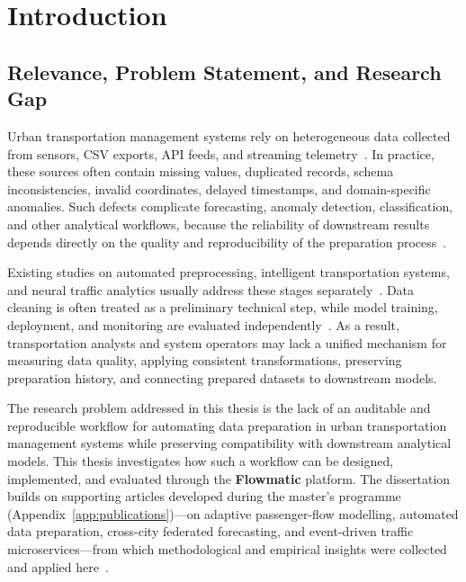 %
%
\chapter{Introduction}
\label{chap:intro}
\setlength{\parskip}{1em}

\section{Relevance, Problem Statement, and Research Gap}

Urban transportation management systems rely on heterogeneous data collected from sensors, CSV exports, API feeds, and streaming telemetry~\cite{wang1996beyond,pipino2002data,zanella2014iot}. In practice, these sources often contain missing values, duplicated records, schema inconsistencies, invalid coordinates, delayed timestamps, and domain-specific anomalies. Such defects complicate forecasting, anomaly detection, classification, and other analytical workflows, because the reliability of downstream results depends directly on the quality and reproducibility of the preparation process~\cite{sculley2015hidden}.

Existing studies on automated preprocessing, intelligent transportation systems, and neural traffic analytics usually address these stages separately~\cite{liu2022automated,feurer2019auto,feurer2015autosklearn,its_bigdata2018,nie2023patchtst,yu2018stgcn,zeng2023transformers}. Data cleaning is often treated as a preliminary technical step, while model training, deployment, and monitoring are evaluated independently~\cite{zaharia2018accelerating,kreutzberger2022mlops}. As a result, transportation analysts and system operators may lack a unified mechanism for measuring data quality, applying consistent transformations, preserving preparation history, and connecting prepared datasets to downstream models.

The research problem addressed in this thesis is the lack of an auditable and reproducible workflow for automating data preparation in urban transportation management systems while preserving compatibility with downstream analytical models. This thesis investigates how such a workflow can be designed, implemented, and evaluated through the \textbf{Flowmatic} platform. The dissertation builds on supporting articles developed during the master's programme (Appendix~\ref{app:publications})---on adaptive passenger-flow modelling, automated data preparation, cross-city federated forecasting, and event-driven traffic microservices---from which methodological and empirical insights were collected and applied here~\cite{bakytuly2024hybrid,yedilkhan2025flowmatic,bakytuly2025adaptive,bakytuly2026microservices,sakhipov2026xfedformer}.

